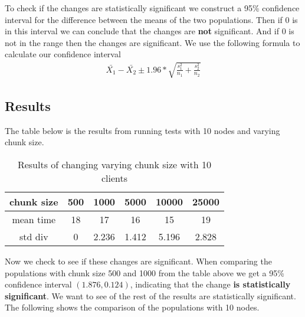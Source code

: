 \documentclass[a4paper, 12pt]{article}
\begin{document}
			To check if the changes are statistically significant we construct a 95\% confidence interval for the difference between the means of the two populations. Then if 0 is in this interval we can conclude that the changes are \textbf{not} significant. And if 0 is not in the range then the changes are significant. We use the following formula to calculate our confidence interval\\
			
			\begin{align*}
				\bar{X_1} - \bar{X_2} \pm 1.96*\sqrt{\frac{s^2_1}{n_1} + \frac{s^2_2}{n_2}}
			\end{align*}
 			
		\subsection{Results}
			The table below is the results from running tests with 10 nodes and varying chunk size.
		
			\begin{table}[H]
				\begin{center}
					\begin{tabular}{ | c c c c c c |}
					\hline
					chunk size & 500 & 1000 & 5000 & 10000 & 25000\\
					\hline
					\hline
					mean time & 18 & 17 & 16 & 15 & 19\\
					std div & 0 & 2.236 & 1.412 & 5.196 & 2.828\\
					\hline
					\end{tabular}
				\caption{Results of changing varying chunk size with 10 clients}
				\end{center}
			\end{table}
			
		
			Now we check to see if these changes are significant. When comparing the populations with chunk size 500 and 1000 from the table above we get a 95\% confidence interval $(1.876, 0.124)$, indicating that the change \textbf{is statistically significant}. We want to see of the rest of the results are statistically significant. The following shows the comparison of the populations with 10 nodes.
			
\end{document}
